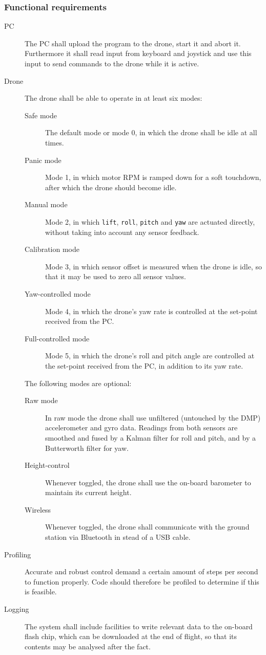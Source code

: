 \documentclass[final]{article}
\begin{document}
\subsubsection{Functional requirements}

\begin{description}
	\item[PC] The PC shall upload the program to the drone, start it and abort it. Furthermore it shall read input from keyboard and joystick and use this input to send commands to the drone while it is active.
	\item[Drone] The drone shall be able to operate in at least six modes:
	\begin{description}
		\item[Safe mode] The default mode or mode 0, in which the drone shall be idle at all times.
		\item[Panic mode] Mode 1, in which motor RPM is ramped down for a soft touchdown, after which the drone should become idle.
		\item[Manual mode] Mode 2, in which \texttt{lift}, \texttt{roll}, \texttt{pitch} and \texttt{yaw} are actuated directly, without taking into account any sensor feedback.
		\item[Calibration mode] Mode 3, in which sensor offset is measured when the drone is idle, so that it may be used to zero all sensor values.
		\item[Yaw-controlled mode] Mode 4, in which the drone's yaw rate is controlled at the set-point received from the PC.
		\item[Full-controlled mode] Mode 5, in which the drone's roll and pitch angle are controlled at the set-point received from the PC, in addition to its yaw rate.
	\end{description}
	The following modes are optional:
	\begin{description}
		\item[Raw mode] In raw mode the drone shall use unfiltered (untouched by the DMP) accelerometer and gyro data. Readings from both sensors are smoothed and fused by a Kalman filter for roll and pitch, and by a Butterworth filter for yaw.
		\item[Height-control] Whenever toggled, the drone shall use the on-board barometer to maintain its current height.
		\item[Wireless] Whenever toggled, the drone shall communicate with the ground station via Bluetooth in stead of a USB cable.
	\end{description}
	\item[Profiling] Accurate and robust control demand a certain amount of steps per second to function properly. Code should therefore be profiled to determine if this is feasible.
	\item[Logging] The system shall include facilities to write relevant data to the on-board flash chip, which can be downloaded at the end of flight, so that its contents may be analysed after the fact.
\end{description}
\end{document}
